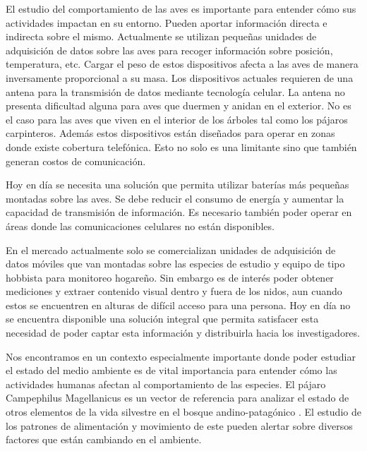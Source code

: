 %

%


El estudio del comportamiento de las aves es importante para entender cómo sus actividades impactan en su entorno. Pueden aportar información directa e indirecta sobre el mismo. Actualmente se utilizan pequeñas unidades de adquisición de datos sobre las aves para recoger información sobre posición, temperatura, etc. 
Cargar el peso de estos dispositivos afecta a las aves de manera inversamente proporcional a su masa. Los dispositivos actuales requieren de una antena para la transmisión de datos mediante tecnología celular. La antena no presenta dificultad alguna para aves que duermen y anidan en el exterior. No es el caso para las aves que viven en el interior de los árboles tal como los pájaros carpinteros. Además estos dispositivos están diseñados para operar en zonas donde existe cobertura telefónica. Esto no solo es una limitante sino que también generan costos de comunicación.

Hoy en día se necesita una solución que permita utilizar baterías más pequeñas montadas sobre las aves. Se debe reducir el consumo de energía y aumentar la capacidad de transmisión de información. Es necesario también poder operar en áreas donde las comunicaciones celulares no están disponibles.

En el mercado actualmente solo se comercializan unidades de adquisición de datos móviles que van montadas sobre las especies de estudio y equipo de tipo hobbista para monitoreo hogareño. Sin embargo es de interés poder obtener mediciones y extraer contenido visual dentro y fuera de los nidos, aun cuando estos se encuentren en alturas de difícil acceso para una persona. Hoy en día no se encuentra disponible una solución integral que permita satisfacer esta necesidad de poder captar esta información y distribuirla hacia los investigadores.


Nos encontramos en un contexto especialmente importante donde poder estudiar el estado del medio ambiente es de vital importancia para entender cómo las actividades humanas afectan al comportamiento de las especies. El pájaro Campephilus Magellanicus es un vector de referencia para analizar el estado de otros elementos de la vida silvestre en el bosque andino-patagónico \cite{ref:PaperValeriaOjeda}. El estudio de los patrones de alimentación y movimiento de este pueden alertar sobre diversos factores que están cambiando en el ambiente.

%